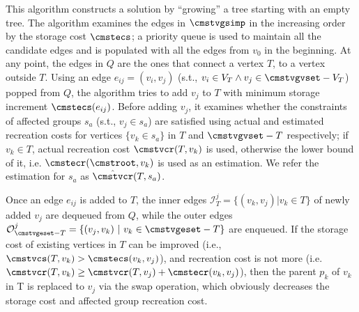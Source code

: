 \documentclass[conference]{IEEEtran}
\begin{document}
This algorithm constructs a solution by ``growing'' a tree starting with an empty tree.
The algorithm examines the edges in $\cmstvgsimp$ in the increasing order by the storage cost $\cmstecs$; a priority
queue is used to maintain all the candidate edges and is populated with all the edges from $v_0$ in the beginning. 
At any point, the edges in $Q$ are the ones that connect a vertex $T$, to a vertex outside $T$.
Using an edge $e_{ij} = (v_i, v_j)$ (s.t., $v_i \in V_T \wedge v_j \in \cmstvgvset-V_T$) popped from $Q$, the algorithm
tries to add $v_j$ to $T$ with minimum storage increment $\cmstecs(e_{ij})$.
Before adding $v_j$, it examines whether the constraints of affected groups $s_a$ (s.t., $v_j \in s_a$) are satisfied 
using actual and estimated recreation costs
for vertices $\{v_k \in s_a\}$ in $T$ and $\cmstvgvset-T$ respectively; if $v_k
\in T$, actual recreation cost $\cmstvcr(T, v_k)$ is used, otherwise the lower
bound of it, i.e. $\cmstecr(\cmstroot, v_k)$ is used as an estimation. We refer
the estimation for $s_a$ as $\hat\cmstvcr(T, s_a)$. 

Once an edge $e_{ij}$ is added to $T$, the inner edges $\mathcal{I}^j_T = \{(v_k, v_j) | v_k \in T\}$ of newly added $v_j$ are dequeued from $Q$, while the outer edges $\mathcal{O}^j_{\cmstvgeset - T} = \{(v_j, v_k)\ |\ v_k \in \cmstvgeset - T\}$ are enqueued. If the storage cost of existing vertices in $T$ can be improved (i.e., $\cmstvcs(T, v_k) > \cmstecs(v_k, v_j)$), and recreation cost is not more (i.e. $\cmstvcr(T, v_k) \geq \cmstvcr(T, v_j) + \cmstecr(v_k,v_j)$), then the parent $p_k$ of $v_k$ in T is replaced to $v_j$ via the swap operation, which obviously decreases the storage cost and affected group recreation cost. 
\end{document}
